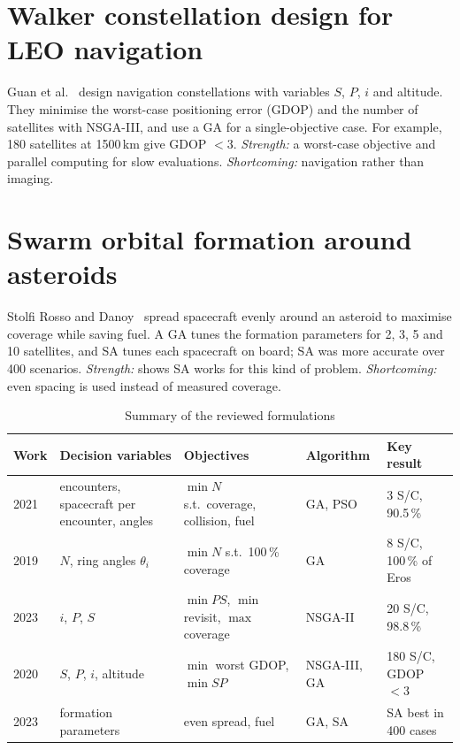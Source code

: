 \section{Walker constellation design for LEO navigation}
Guan et al.~\cite{guan2020} design navigation constellations with variables $S$, $P$, $i$
and altitude. They minimise the worst-case positioning error (GDOP) and the number of
satellites with NSGA-III, and use a GA for a single-objective case. For example, 180
satellites at 1500\,km give GDOP $<3$. \emph{Strength:} a worst-case objective and parallel
computing for slow evaluations. \emph{Shortcoming:} navigation rather than imaging.

\section{Swarm orbital formation around asteroids}
Stolfi Rosso and Danoy~\cite{stolfi2023} spread spacecraft evenly around an asteroid to
maximise coverage while saving fuel. A GA tunes the formation parameters for 2, 3, 5 and
10 satellites, and SA tunes each spacecraft on board; SA was more accurate over 400
scenarios. \emph{Strength:} shows SA works for this kind of problem. \emph{Shortcoming:}
even spacing is used instead of measured coverage.

\begin{table}[H]
\centering
\caption{Summary of the reviewed formulations}
\label{tab:lit}
\footnotesize
\begin{tabularx}{\textwidth}{@{}p{1.1cm}p{2.9cm}Xp{1.9cm}p{2.7cm}@{}}
\toprule
Work & Decision variables & Objectives & Algorithm & Key result \\
\midrule
\cite{nallapu2021} 2021 & encounters, spacecraft per encounter, angles & $\min N$ s.t.\ coverage, collision, fuel & GA, PSO & 3 S/C, 90.5\,\% \\
\cite{nallapu2019} 2019 & $N$, ring angles $\theta_i$ & $\min N$ s.t.\ 100\,\% coverage & GA & 8 S/C, 100\,\% of Eros \\
\cite{melaku2023} 2023 & $i$, $P$, $S$ & $\min PS$, $\min$ revisit, $\max$ coverage & NSGA-II & 20 S/C, 98.8\,\% \\
\cite{guan2020} 2020 & $S$, $P$, $i$, altitude & $\min$ worst GDOP, $\min SP$ & NSGA-III, GA & 180 S/C, GDOP $<3$ \\
\cite{stolfi2023} 2023 & formation parameters & even spread, fuel & GA, SA & SA best in 400 cases \\
\bottomrule
\end{tabularx}
\end{table}


